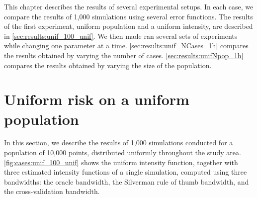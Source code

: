 

This chapter describes the results of several experimental setups.
In each case, we compare the results of 1,000 simulations using several error functions.
The results of the first experiment, uniform population and a uniform intensity, are described in \autoref{sec:results:unif_100_unif}.
We then made ran several sets of experiments while changing one parameter at a time.
\autoref{sec:results:unif_NCases_1h} compares the results obtained by varying the number of cases.
\autoref{sec:results:unifNpop_1h} compares the results obtained by varying the size of the population.


\section{Uniform risk on a uniform population}
\label{sec:results:unif_100_unif}

In this section, we describe the results of 1,000 simulations conducted for a population of 10,000 points, distributed uniformly throughout the study area.
\autoref{fig:cases:unif_100_unif} shows the uniform intensity function, together with three estimated intensity functions of a single simulation,
computed using three bandwidths: the oracle bandwidth, the Silverman rule of thumb bandwidth, and the cross-validation bandwidth.

